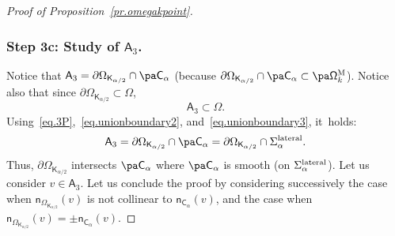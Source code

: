 \begin{proof}[Proof of Proposition~\ref{pr.omegakpoint}]
\subsubsection*{Step 3c: Study of $\mathsf A_3$. }
Notice that $\mathsf A_3=\partial \Omega_{\mathsf K_{\alpha/2}}\cap \pa \mathsf C_\alpha$ (because $\partial \Omega_{\mathsf K_{\alpha/2}}\cap \pa \mathsf C_\alpha\subset \pa \mathsf \Omega_k^{\textsc{M}}$). Notice also that since $\partial \Omega_{\mathsf K_{\alpha/2}}\subset \Omega$,
\begin{equation}\label{eq.A3}
\mathsf A_3 \subset \Omega.
\end{equation}
Using~\eqref{eq.3P},~\eqref{eq.unionboundary2}, and~\eqref{eq.unionboundary3}, it~holds:
\begin{equation}\label{eq.A3-lateral}
\mathsf A_3= \partial \Omega_{\mathsf K_{\alpha/2}}\cap \pa \mathsf C_\alpha =\partial \Omega_{\mathsf K_{\alpha/2}}\cap \Sigma_\alpha^{\textup{lateral}}.
\end{equation}
Thus, $ \partial \Omega_{\mathsf K_{\alpha/2}}$ intersects $ \pa \mathsf C_\alpha$ where $\pa \mathsf C_\alpha$ is smooth (\ie on $\Sigma_\alpha^{\textup{lateral}}$).
Let us consider $v\in \mathsf A_3$. Let us conclude the proof by
considering successively the case when $\mathsf n_{\Omega_{\mathsf
K_{\alpha/2}}}(v)$ is not collinear to $\mathsf n_{\mathsf
C_\alpha}(v)$, and the case when $\mathsf n_{\Omega_{\mathsf K_{\alpha/2}}}(v)=\pm \mathsf n_{\mathsf C_\alpha}(v)$.


\end{proof}
